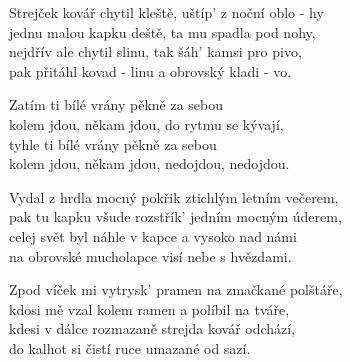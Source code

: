 
\ve{}
Strejček kovář \quad chytil kleště, uštíp' z noční oblo - hy\\
jednu malou \quad kapku \quad{}deště, ta mu spadla pod nohy,\\
nejdřív ale \quad chytil \quad slinu, \quad tak šáh' kamsi pro pivo,\\
pak přitáhl \quad kovad - linu \quad {}a obrovský kladi - vo.

\cho{}
Zatím ti bílé vrány \quad {}pěkně za sebou\\
kolem jdou, někam jdou, do rytmu se kývají,\\
tyhle ti bílé vrány \quad {}pěkně za sebou\\
kolem jdou, někam jdou, nedojdou, nedojdou.

\ve{}
Vydal z hrdla mocný pokřik ztichlým letním večerem,\\
pak tu kapku všude rozstřík' jedním mocným úderem,\\
celej svět byl náhle v kapce a vysoko nad námi\\
na obrovské mucholapce visí nebe s hvězdami.

\cho{}

\ve{}
Zpod víček mi vytrysk' pramen na zmačkané polštáře,\\
kdosi mě vzal kolem ramen a políbil na tváře,\\
kdesi v dálce rozmazaně strejda kovář odchází,\\
do kalhot si čistí ruce umazané od sazí.

\cho{}

\esong

